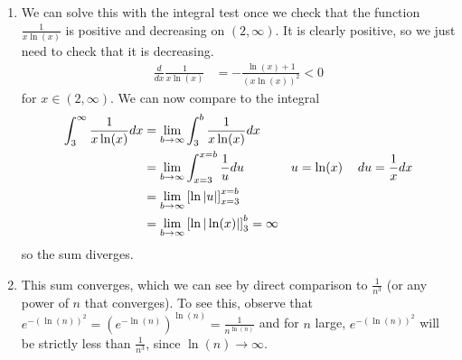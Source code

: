 {\begin{enumerate}
\begin{align*}
\lim_{n \to \infty} |\frac{a_{n+1}}{a_n}| &= \lim_{n \to \infty} \frac{\left(\frac{x^{2(n+1)+1}}{(2(n+1)+1)!}\right)}{\left(\frac{x^{2n+1}}{(2n+1)!}\right)} \\
&= \lim_{n \to \infty} \frac{x^2}{(2n+3)(2n+2)} = 0
\end{align*}
so this sum converges for all $x$.
\item We can solve this with the integral test once we check that the function $\frac{1}{x\ln(x)}$ is positive and decreasing on $(2,\infty)$.  It is clearly positive, so we just need to check that it is decreasing.
\begin{align*}
\frac{d}{dx} \frac{1}{x \ln(x)} &= -\frac{\ln(x) + 1}{(x \ln(x))^2} < 0
\end{align*}
for $x \in (2,\infty)$.  We can now compare to the integral
\begin{align*}
\int_3^\infty \frac{1}{x\ln(x)} dx &= \lim_{b \to \infty} \int_3^b \frac{1}{x\ln(x)} dx \\
&= \lim_{b \to \infty} \int_{x = 3}^{x = b} \frac{1}{u} du & u = \ln(x) \hspace{1pc} du = \frac{1}{x} dx \\
&= \lim_{b \to \infty} \left[\ln|u| \right]_{x=3}^{x=b} \\
&= \lim_{b \to \infty} \left[\ln|\ln(x)| \right]_3^b = \infty
\end{align*}
so the sum diverges.
\item This sum converges, which we can see by direct comparison to $\frac{1}{n^3}$ (or any power of $n$ that converges).  To see this, observe that $e^{-\left(\ln(n)\right)^2} = \left(e^{-\ln(n)}\right)^{\ln(n)} = \frac{1}{n^{\ln(n)}}$ and for $n$ large, $e^{-\left(\ln(n)\right)^2}$ will be strictly less than $\frac{1}{n^3}$, since $\ln(n) \to \infty$.
\end{enumerate}
}

